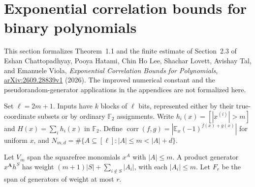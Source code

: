 \section{Exponential correlation bounds for binary polynomials}
\label{sec:analysis-polynomial-correlation}

This section formalizes Theorem~1.1 and the finite estimate of Section~2.3 of
Eshan Chattopadhyay, Pooya Hatami, Chin Ho Lee, Shachar Lovett, Avishay Tal,
and Emanuele Viola, \emph{Exponential Correlation Bounds for Polynomials},
\href{https://arxiv.org/abs/2609.28839}{arXiv:2609.28839v1} (2026).
The improved numerical constant and the pseudorandom-generator applications
in the appendices are not formalized here.

\begin{definition}
  \label{def:analysis-polynomial-correlation}
  \leanok
  Set $\ell=2m+1$. Inputs have $k$ blocks of $\ell$ bits, represented either
  by their true-coordinate subsets or by ordinary $\mathbb F_2$ assignments.
  Write $h_i(x)=[|x^{(i)}|>m]$ and $H(x)=\sum_i h_i(x)$ in $\mathbb F_2$.
  Define $\operatorname{corr}(f,g)=|\mathbb E_x(-1)^{f(x)+g(x)}|$ for uniform $x$,
  and $N_{m,d}=\#\{A\subseteq[\ell]:|A|\le m<|A|+d\}$.
\end{definition}

\begin{definition}
  \label{def:analysis-polynomial-weight}
  \leanok
  Let $V_m$ span the squarefree monomials $x^A$ with $|A|\le m$.
  A product generator $x^{\mathbf A}h^S$ has weight
  $(m+1)|S|+\sum_{i\notin S}|A_i|$, with each $|A_i|\le m$.
  Let $F_r$ be the span of generators of weight at most $r$.
\end{definition}

